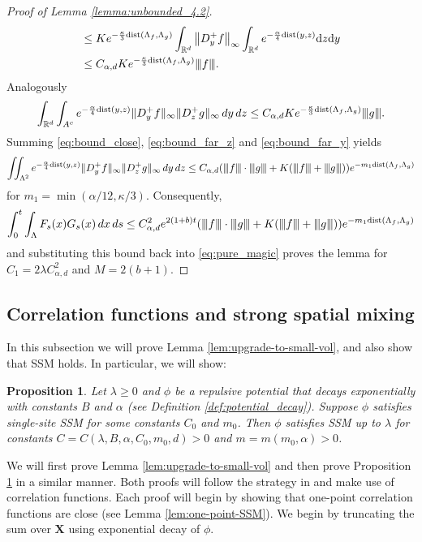 \documentclass[10pt]{amsart}
\newtheorem{proposition}[theorem]{Proposition}
\theoremstyle{definition}
\theoremstyle{remark}
\newcommand{\tnorm}[1]{{\left\vert\kern-0.25ex\left\vert\kern-0.25ex\left\vert #1 
		\right\vert\kern-0.25ex\right\vert\kern-0.25ex\right\vert}}
\newcommand{\bX}{\mathbf{X}}
\newcommand{\dist}{\mathrm{dist}}
\newcommand{\R}{\mathbb{R}}
\newcommand{\region}{\Lambda}
\newcommand{\activity}{\lambda}
\newcommand{\diff}{\mathrm{d}}
\newcommand{\norm}[1]{\left\lVert#1\right\rVert}
\begin{document}
\begin{proof}[Proof of Lemma \ref{lemma:unbounded_4.2}]
\begin{align}
			&\leq K e^{- \frac{\kappa}{3} \dist(\region_f, \region_g)} \int_{\R^d} \norm{D_y^+ f}_{\infty} \int_{\R^d} e^{-\frac{\alpha}{4}  \dist(y,z)} \diff z \diff y \\
			&\le C_{\alpha, d} K e^{- \frac{\kappa}{3} \dist(\region_f, \region_g)} \tnorm{f} . \label{eq:bound_far_z}
		\end{align}
		Analogously 
		\begin{align}
			\int_{\R^d} \int_{A^c} e^{-\frac{\alpha}{4}  \dist(y,z)} \| D_y^+ f\|_\infty  \|D_z^+ g\|_\infty \,dy\,dz
			\le C_{\alpha, d} K e^{- \frac{\kappa}{3} \dist(\region_f, \region_g)} \tnorm{g} \label{eq:bound_far_y} .
		\end{align}
		Summing \eqref{eq:bound_close}, \eqref{eq:bound_far_z} and \eqref{eq:bound_far_y} yields
		\[
		\iint_{\region^2} e^{-\frac{\alpha}{4} \dist(y,z)} \| D_y^+ f\|_\infty  \|D_z^+ g\|_\infty \,dy\,dz \leq C_{\alpha, d}  (\tnorm{f}  \cdot \tnorm{g} + K  (\tnorm{f} + \tnorm{g}))  e^{- m_1  \dist(\region_f, \region_g)}
		\]
		for $m_1 = \min(\alpha/12, \kappa/3)$.
		Consequently,
		\[
		\int_0^t \int_\Lambda F_s(x) G_s(x) \,dx \,ds \le C_{\alpha, d}^2 e^{2(1+b)t}  (\tnorm{f} \cdot  \tnorm{g} + K  (\tnorm{f} + \tnorm{g}))  e^{- m_1  \dist(\region_f, \region_g)}
		\]
		and substituting this bound back into \eqref{eq:pure_magic} proves the lemma for $C_1 = 2 \activity C_{\alpha, d}^2$ and $M=2(b+1)$.
	\end{proof}
	
	\subsection{Correlation functions and strong spatial mixing} \label{sec:cor-SSM}
	
	
	In this subsection we will prove Lemma \ref{lem:upgrade-to-small-vol}, and also show that SSM holds.  In particular, we will show: 
	
	\begin{proposition}\label{prop:SSM}
		Let $\lambda \geq 0$ and $\phi$ be a repulsive potential that decays exponentially with constants $B$ and $\alpha$ (see Definition \ref{def:potential_decay}).  Suppose $\phi$ satisfies single-site SSM for some constants $C_0$ and $m_0$.  Then $\phi$ satisfies SSM up to $\lambda$ for constants $C = C(\lambda,B,\alpha,C_0,m_0,d) > 0$ and $m = m(m_0,\alpha) > 0$.
	\end{proposition}
	
	
	
	We will first prove Lemma \ref{lem:upgrade-to-small-vol} and then prove Proposition \ref{prop:SSM} in a similar manner.  Both proofs will follow the strategy in \cite{michelen2022strong} and make use of correlation functions.  Each proof will begin by showing that one-point correlation functions are close (see Lemma \ref{lem:one-point-SSM}).    
	We begin by truncating the sum over $\bX$ using exponential decay of $\phi$.
	
\end{document}
